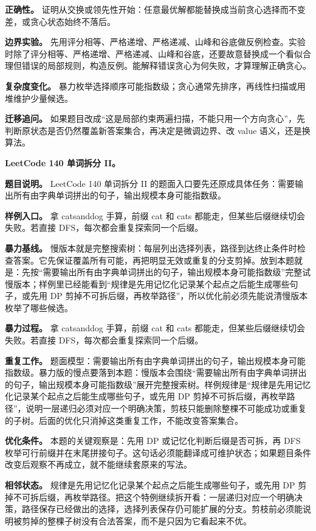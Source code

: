 \textbf{正确性。} 证明从交换或领先性开始：任意最优解都能替换成当前贪心选择而不变差，或贪心状态始终不落后。

\textbf{边界实验。} 先用评分相等、严格递增、严格递减、山峰和谷底做反例检查。实验时除了评分相等、严格递增、严格递减、山峰和谷底，还要故意替换成一个看似合理但错误的局部规则，构造反例。能解释错误贪心为何失败，才算理解正确贪心。

\textbf{复杂度变化。} 暴力枚举选择顺序可能指数级；贪心通常先排序，再线性扫描或用堆维护少量候选。

\textbf{迁移追问。} 如果题目改成“这是局部约束两遍扫描，不能只用一个方向贪心”，先判断原状态是否仍然覆盖新答案集合，再决定是微调边界、改 value 语义，还是换算法。

\noindent\textbf{LeetCode 140 单词拆分 II。}

\textbf{题目说明。} LeetCode 140 单词拆分 II 的题面入口要先还原成具体任务：需要输出所有由字典单词拼出的句子，输出规模本身可能指数级。

\textbf{样例入口。} 拿 catsanddog 手算，前缀 cat 和 cats 都能走，但某些后缀继续切会失败。若直接 DFS，每次都会重复探索同一个后缀。

\textbf{暴力基线。} 慢版本就是完整搜索树：每层列出选择列表，路径到达终止条件时检查答案。它先保证覆盖所有可能，再把明显无效或重复的分支剪掉。放到本题就是：先按“需要输出所有由字典单词拼出的句子，输出规模本身可能指数级”完整试慢版本；样例里已经能看到“规律是先用记忆化记录某个起点之后能生成哪些句子，或先用 DP 剪掉不可拆后缀，再枚举路径”，所以优化前必须先能说清慢版本枚举了哪些候选。

\textbf{暴力过程。} 拿 catsanddog 手算，前缀 cat 和 cats 都能走，但某些后缀继续切会失败。若直接 DFS，每次都会重复探索同一个后缀。

\textbf{重复工作。} 题面模型：需要输出所有由字典单词拼出的句子，输出规模本身可能指数级。暴力版的慢点要落到本题：慢版本会围绕“需要输出所有由字典单词拼出的句子，输出规模本身可能指数级”展开完整搜索树。样例规律是“规律是先用记忆化记录某个起点之后能生成哪些句子，或先用 DP 剪掉不可拆后缀，再枚举路径”，说明一层递归必须对应一个明确决策，剪枝只能删除整棵不可能成功或重复的子树。后面的优化只消掉这类重复工作，不能改变答案集合。

\textbf{优化条件。} 本题的关键观察是：先用 DP 或记忆化判断后缀是否可拆，再 DFS 枚举可行前缀并在末尾拼接句子。这句话必须能翻译成可维护状态；如果题目条件改变后观察不再成立，就不能继续套原来的写法。

\textbf{相邻状态。} 规律是先用记忆化记录某个起点之后能生成哪些句子，或先用 DP 剪掉不可拆后缀，再枚举路径。把这个特例继续拆开看：一层递归对应一个明确决策，路径保存已经做出的选择，选择列表保存仍可能扩展的分支。剪枝前必须能说明被剪掉的整棵子树没有合法答案，而不是只因为它看起来不优。

